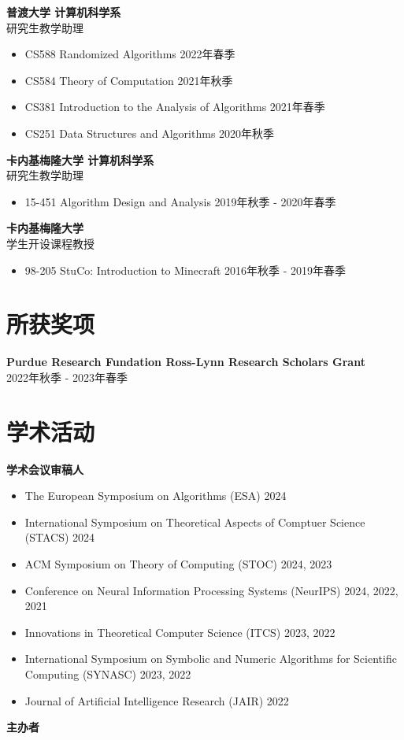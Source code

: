 \documentclass[margin, 10pt]{res} %
\begin{document}
\begin{resume}
{\bf 普渡大学 计算机科学系}\\
研究生教学助理

\begin{itemize}
\item CS588 Randomized Algorithms \hfill 2022年春季
\item CS584 Theory of Computation \hfill 2021年秋季
\item CS381 Introduction to the Analysis of Algorithms \hfill 2021年春季
\item CS251 Data Structures and Algorithms \hfill 2020年秋季
\end{itemize}
{\bf 卡内基梅隆大学 计算机科学系}\\
研究生教学助理

\begin{itemize}
\item 15-451 Algorithm Design and Analysis \hfill 2019年秋季 - 2020年春季
\end{itemize}

{\bf 卡内基梅隆大学}\\
学生开设课程教授

\begin{itemize}
\item 98-205 StuCo: Introduction to Minecraft \hfill 2016年秋季 - 2019年春季
\end{itemize}

\section{所获奖项}
{\bf Purdue Research Fundation Ross-Lynn Research Scholars Grant} \\\hfill 2022年秋季 - 2023年春季

\section{学术活动}

{\bf 学术会议审稿人}

\begin{itemize}
\item The European Symposium on Algorithms (ESA) 2024
\item International Symposium on Theoretical Aspects of Comptuer Science (STACS) 2024
\item ACM Symposium on Theory of Computing (STOC) 2024, 2023
\item Conference on Neural Information Processing Systems (NeurIPS) 2024, 2022, 2021
\item Innovations in Theoretical Computer Science (ITCS) 2023, 2022
\item International Symposium on Symbolic and Numeric Algorithms for Scientific Computing (SYNASC) 2023, 2022
\item Journal of Artificial Intelligence Research (JAIR) 2022
\end{itemize}
{\bf 主办者}


\end{resume}
\end{document}
